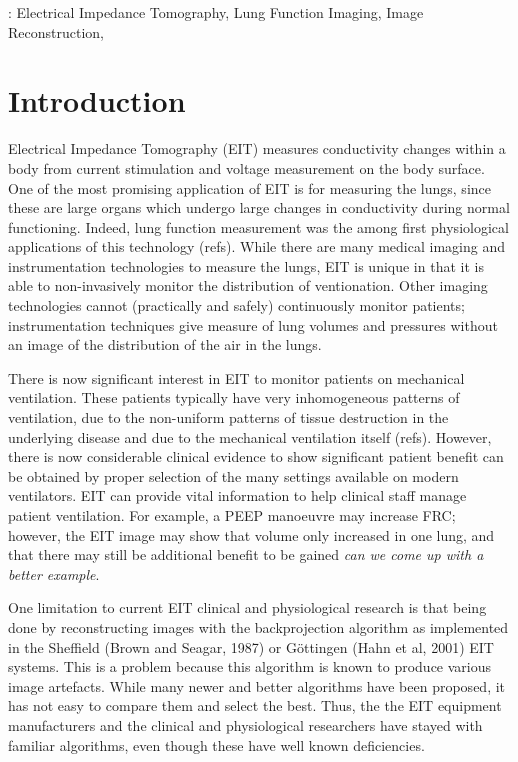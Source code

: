 \documentclass[letterpaper,twocolumn,11pt]{article}
\begin{document}
:
Electrical Impedance Tomography,
Lung Function Imaging,
Image Reconstruction,

\section{Introduction}
Electrical Impedance Tomography (EIT) measures conductivity
changes within a body from current stimulation and voltage
measurement on the body surface. One of the most promising
application of EIT is for measuring the lungs, since these
are large organs which undergo large changes in conductivity
during normal functioning. Indeed, lung function measurement
was the among first physiological applications of this technology
(refs). While there are many medical imaging and instrumentation
technologies to measure the lungs, EIT is unique in that it
is able to non-invasively monitor the distribution of 
ventionation. Other imaging technologies cannot (practically 
and safely) continuously monitor patients; instrumentation
techniques give measure of lung volumes and pressures without
an image of the distribution of the air in the lungs. 

There is now significant interest in EIT to 
monitor patients on mechanical ventilation. These patients
typically have very inhomogeneous patterns of ventilation,
due to the non-uniform patterns of tissue destruction
in the underlying disease and due to the mechanical ventilation
itself (refs). However, there is now considerable clinical
evidence to show significant patient benefit can be obtained
by proper selection of the many settings
available on modern ventilators. EIT can provide vital 
information to help clinical staff manage patient ventilation.
For example, a PEEP manoeuvre may increase FRC; however, the
EIT image may show that volume only increased in one lung, and
that there may still be additional benefit to be gained 
{\em can we come up with a better example}.

One limitation to current EIT clinical and physiological research
is that being done by reconstructing images with the backprojection
algorithm as implemented
in the Sheffield (Brown and Seagar, 1987)
or G\"ottingen (Hahn et al, 2001) EIT systems. This is a 
problem because this algorithm is known to produce various
image artefacts.
While many newer and better algorithms have been proposed, it has
not easy  to compare them and select the best. Thus, the
the EIT equipment manufacturers and the clinical and physiological
researchers have stayed with familiar algorithms, even though
these have well known deficiencies. 
\end{document}
